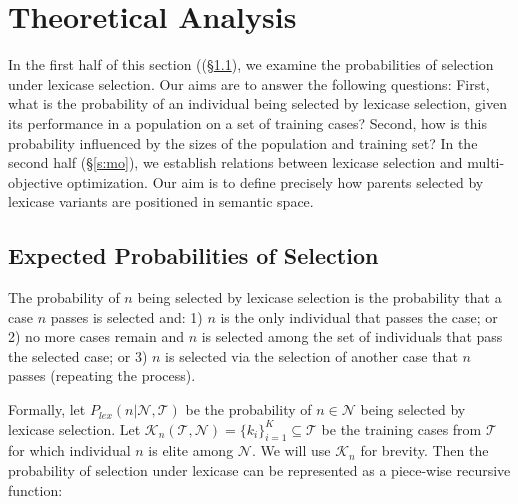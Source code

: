 \documentclass[twoside]{article}
\newcommand{\edit}[1]{{\color{red} #1}}
\begin{document}
\edit{
\section{Theoretical Analysis}
In the first half of this section ((\S\ref{s:prob}), we examine the probabilities of selection under lexicase selection. Our aims are to answer the following questions: First, what is the probability of an individual being selected by lexicase selection, given its performance in a population on a set of training cases? Second, how is this probability influenced by the sizes of the population and training set?  In the second half (\S\ref{s:mo}), we establish relations between lexicase selection and multi-objective optimization. Our aim is to define precisely how parents selected by lexicase variants are positioned in semantic space.}

\subsection{Expected Probabilities of Selection}\label{s:prob}
The probability of $n$ being selected by lexicase selection is the probability that a case $n$ passes is selected and: 1) $n$ is the only individual that passes the case; or 2) no more cases remain and $n$ is selected among the set of individuals that pass the selected case; or 3) $n$ is selected via the selection of another case that $n$ passes (repeating the process). 

Formally, let $P_{lex}(n | \mathcal{N}, \mathcal{T})$ be the probability of $n \in \mathcal{N}$ being selected by lexicase selection. Let $\mathcal{K}_n(\mathcal{T},\mathcal{N}) = \{k_i\}_{i=1}^K \subseteq \mathcal{T}$ be the training cases from $\mathcal{T}$ for which individual $n$ is elite among $\mathcal{N}$. We will use $\mathcal{K}_n$ for brevity. Then the probability of selection under lexicase can be represented as a piece-wise recursive function: 


\end{document}

